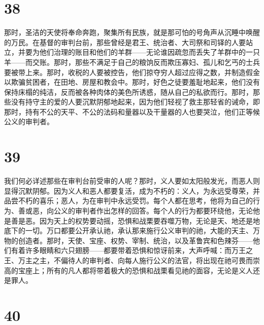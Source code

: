 
\section{38}

那时，圣洁的天使将奉命奔跑，聚集所有民族，就是那可怕的号角声从沉睡中唤醒的万民。在基督的审判台前，那些曾经是君王、统治者、大司祭和司铎的人要站立，并要为他们治理的账目和他们的羊群——无论谁因疏忽而丢失了羊群中的一只羊——而交账。那时，那些不满足于自己的粮饷反而欺压寡妇、孤儿和乞丐的士兵要被带上来。那时，收税的人要被控告，他们掠夺穷人超过应得之数，并制造假金以欺骗贫困者，在田地、房屋和教会中。那时，好色之徒要羞耻地起来，他们没有保持床榻的纯洁，反而被各种肉体的美色所诱惑，随从自己的私欲而行。那时，那些没有持守主的爱的人要沉默阴郁地起来，因为他们轻视了救主那轻省的诫命，即那时，持有不公的天平、不公的法码和量器以及干量器的人也要哭泣，他们正等候公义的审判者。\par


\section{39}

我们何必详述那些在审判台前受审的人呢？那时，义人要如太阳般发光，而恶人则显得沉默阴郁。因为义人和恶人都要复活，成为不朽的：义人，为永远受尊荣，并品尝不朽的喜乐；恶人，为在审判中永远受罚。每个人都在思考，他将为自己的行为、善或恶，向公义的审判者作出怎样的回答。每个人的行为都要环绕他，无论他是善是恶。因为天上的权势要动摇，恐惧和战栗要吞噬万物，无论是天、地还是地底下的一切。万口都要公开承认祂，承认那来施行公义审判的祂，大能的天主、万物的创造者。那时，天使、宝座、权势、宰制、统治，以及革鲁宾和色辣芬——他们有着许多眼睛和六只翅膀——都要带着恐惧和惊讶前来，大声呼喊：而万王之王、万主之主，不偏待人的审判者、向每人施行公义的法官，将出现在祂可畏而崇高的宝座上；所有的凡人都将带着极大的恐惧和战栗看见祂的面容，无论是义人还是罪人。\par


\section{40}

